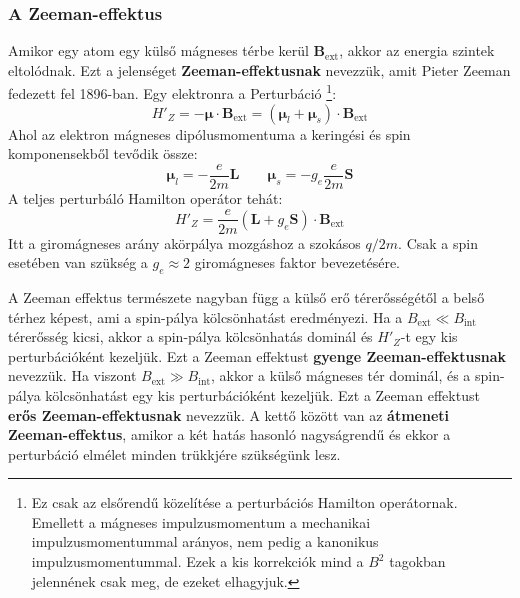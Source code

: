 \documentclass[../main.tex]{subfiles}
\begin{document}
\subsubsection{A Zeeman-effektus}
Amikor egy atom egy külső mágneses térbe kerül $\mathbf{B}_{\text{ext}}$, akkor az energia szintek eltolódnak. Ezt a jelenséget \textbf{Zeeman-effektusnak} nevezzük, amit Pieter Zeeman fedezett fel 1896-ban.
Egy elektronra a Perturbáció
\footnote{Ez csak az elsőrendű közelítése a perturbációs Hamilton operátornak. Emellett a mágneses impulzusmomentum a mechanikai impulzusmomentummal arányos, nem pedig a kanonikus impulzusmomentummal. Ezek a kis korrekciók mind a $B^2$ tagokban jelennének csak meg, de ezeket elhagyjuk.}:
\begin{equation}
    H'_{Z} = - \boldsymbol{\mu} \cdot \mathbf{B}_{\text{ext}} = (\boldsymbol{\mu}_l + \boldsymbol{\mu}_s) \cdot \mathbf{B}_{\text{ext}}
\end{equation}
Ahol az elektron mágneses dipólusmomentuma a keringési és spin komponensekből tevődik össze:
\begin{equation}
    \boldsymbol{\mu}_l = - \frac{e}{2m} \mathbf{L} \qquad \boldsymbol{\mu}_s = - g_e \frac{e}{2m} \mathbf{S}
\end{equation}
A teljes perturbáló Hamilton operátor tehát:
\begin{equation}
    H'_{Z} = \frac{e}{2m} \left( \mathbf{L} + g_e \mathbf{S} \right) \cdot \mathbf{B}_{\text{ext}}
\end{equation}
Itt a giromágneses arány akörpálya mozgáshoz a szokásos $q/2m$. Csak a spin esetében van szükség a $g_e \approx 2$ giromágneses faktor bevezetésére.

A Zeeman effektus természete nagyban függ a külső erő térerősségétől a belső térhez képest, ami a spin-pálya kölcsönhatást eredményezi. Ha a $B_{\text{ext}} \ll B_{\text{int}}$ térerősség kicsi,
akkor a spin-pálya kölcsönhatás dominál és $H'_{Z}$-t egy kis perturbációként kezeljük. Ezt a Zeeman effektust \textbf{gyenge Zeeman-effektusnak} nevezzük. Ha viszont $B_{\text{ext}} \gg B_{\text{int}}$, akkor a külső mágneses tér dominál,
és a spin-pálya kölcsönhatást egy kis perturbációként kezeljük. Ezt a Zeeman effektust \textbf{erős Zeeman-effektusnak} nevezzük. A kettő között van az \textbf{átmeneti Zeeman-effektus}, amikor a két hatás hasonló nagyságrendű és ekkor a perturbáció elmélet minden trükkjére szükségünk lesz.
\end{document}
